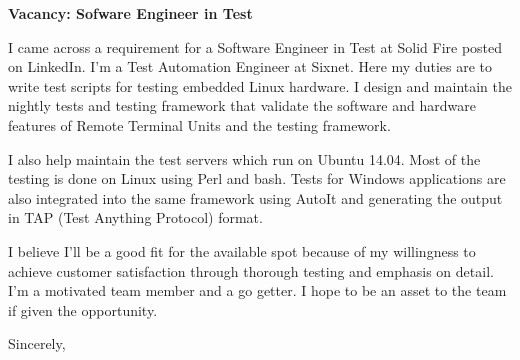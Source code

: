 \documentclass[14pt]{extletter}
\begin{document}
\begin{letter}{}

\opening{\textbf{Vacancy: Sofware Engineer in Test}}
 
I came across a requirement for a Software Engineer in Test at Solid Fire
posted on LinkedIn. I'm a Test Automation Engineer at Sixnet. Here my duties
are to write test scripts for testing embedded Linux hardware. I design and
maintain the nightly tests and testing framework that validate the software and hardware features of Remote Terminal Units and the testing framework.

I also help maintain the test servers which run on Ubuntu 14.04. Most of the
testing is done on Linux using Perl and bash. Tests for Windows applications
are also integrated into the same framework using AutoIt and generating the
output in TAP (Test Anything Protocol) format.

I believe I'll be a good fit for the available spot because of my willingness
to achieve customer satisfaction through thorough testing and emphasis on
detail. I'm a motivated team member and a go getter. I hope to be an asset to
the team if given the opportunity.

\vspace{2\parskip} %
\closing{Sincerely,}
\vspace{2\parskip} %

\end{letter}
 
\end{document}
